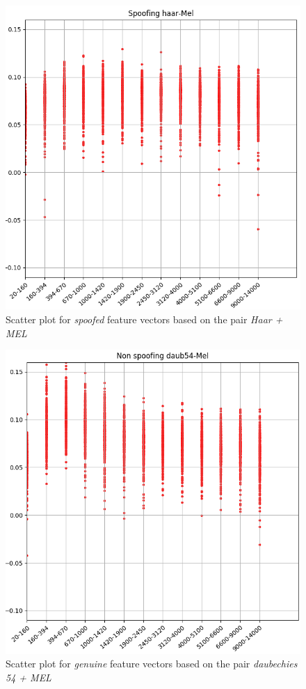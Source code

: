 \begin{figure}[H]
\centering
\includegraphics[scale=.55]{images/results/barkVersusMel/spoofingHaarMel}
\caption{Scatter plot for \textit{spoofed} feature vectors based on the pair \textit{Haar + MEL}}
\label{fig:spoofinghaarmel}
\end{figure}
\begin{figure}[H]
\centering
\includegraphics[scale=.55]{images/results/barkVersusMel/liveDaub54Mel}
\caption{Scatter plot for \textit{genuine} feature vectors  based on the pair \textit{daubechies 54 + MEL}}
\label{fig:livedaub54mel}
\end{figure}
